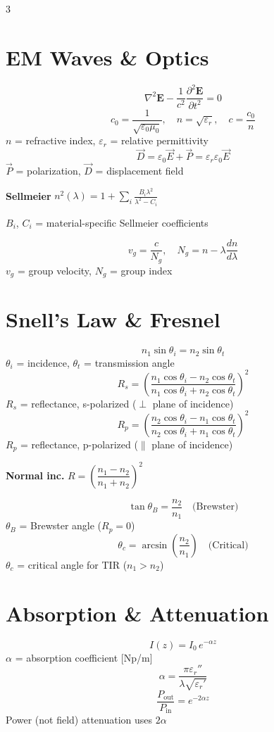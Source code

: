 \documentclass[9pt]{extarticle}
\newcommand{\eqlabel}[1]{\textbf{\scriptsize #1}\;}
\newcommand{\vardef}[1]{{\footnotesize\color{defgray}#1}}
\begin{document}
\begin{multicols}{3}
\section{EM Waves \& Optics}
\[\nabla^2\mathbf{E} - \frac{1}{c^2}\frac{\partial^2\mathbf{E}}{\partial t^2} = 0\]
\[c_0 = \frac{1}{\sqrt{\varepsilon_0\mu_0}},\quad n = \sqrt{\varepsilon_r},\quad c = \frac{c_0}{n}\]
\vardef{$n$ = refractive index, $\varepsilon_r$ = relative permittivity}
\[\vec{D} = \varepsilon_0\vec{E} + \vec{P} = \varepsilon_r\varepsilon_0\vec{E}\]
\vardef{$\vec{P}$ = polarization, $\vec{D}$ = displacement field}

\eqlabel{Sellmeier} $n^2(\lambda) = 1 + \displaystyle\sum_i\frac{B_i\lambda^2}{\lambda^2 - C_i}$

\vardef{$B_i$, $C_i$ = material-specific Sellmeier coefficients}

\[v_g = \frac{c}{N_g},\quad N_g = n - \lambda\frac{dn}{d\lambda}\]
\vardef{$v_g$ = group velocity, $N_g$ = group index}

\section{Snell's Law \& Fresnel}
\[n_1\sin\theta_i = n_2\sin\theta_t\]
\vardef{$\theta_i$ = incidence, $\theta_t$ = transmission angle}
\[R_s = \left(\frac{n_1\cos\theta_i - n_2\cos\theta_t}{n_1\cos\theta_i + n_2\cos\theta_t}\right)^{\!2}\]
\vardef{$R_s$ = reflectance, s-polarized ($\perp$ plane of incidence)}
\[R_p = \left(\frac{n_2\cos\theta_i - n_1\cos\theta_t}{n_2\cos\theta_i + n_1\cos\theta_t}\right)^{\!2}\]
\vardef{$R_p$ = reflectance, p-polarized ($\parallel$ plane of incidence)}

\eqlabel{Normal inc.} $R = \left(\dfrac{n_1-n_2}{n_1+n_2}\right)^{\!2}$

\[\tan\theta_B = \frac{n_2}{n_1} \quad\text{(Brewster)}\]
\vardef{$\theta_B$ = Brewster angle ($R_p = 0$)}
\[\theta_c = \arcsin\!\left(\frac{n_2}{n_1}\right) \quad\text{(Critical)}\]
\vardef{$\theta_c$ = critical angle for TIR ($n_1 > n_2$)}

\section{Absorption \& Attenuation}
\[I(z) = I_0\,e^{-\alpha z}\]
\vardef{$\alpha$ = absorption coefficient [Np/m]}
\[\alpha = \frac{\pi\varepsilon_r''}{\lambda\sqrt{\varepsilon_r'}}\]
\[\frac{P_{\text{out}}}{P_{\text{in}}} = e^{-2\alpha z}\]
\vardef{Power (not field) attenuation uses $2\alpha$}


\end{multicols}
\end{document}
